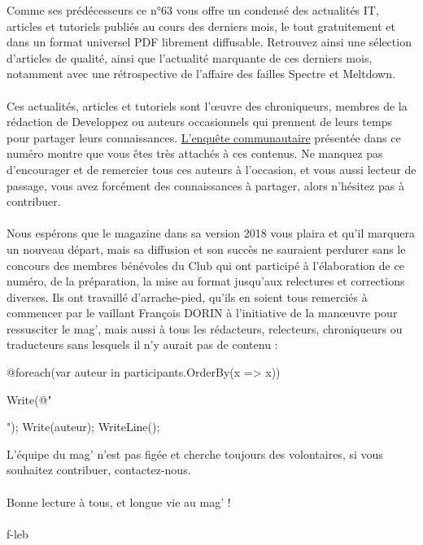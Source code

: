 Comme ses prédécesseurs ce n°63 vous offre un condensé des actualités IT, articles et tutoriels publiés au cours des derniers mois, le tout gratuitement et dans un format universel PDF librement diffusable. 
Retrouvez ainsi une sélection d'articles de qualité, ainsi que l'actualité marquante de ces derniers mois, notamment avec une rétrospective de l'affaire des failles Spectre et Meltdown.

\paragraph*{}

Ces actualités, articles et tutoriels sont l’œuvre des chroniqueurs, membres de la rédaction de Developpez ou auteurs occasionnels qui prennent de leurs temps pour partager leurs connaissances.
\hyperref[article-mag63-club-enquete-communautaire]{L'enquête communautaire} présentée dans ce numéro montre que vous êtes très attachés à ces contenus. Ne manquez pas d'encourager et de remercier 
tous ces auteurs à l'occasion, et vous aussi lecteur de passage, vous avez forcément des connaissances à partager, alors n'hésitez pas à contribuer.

\paragraph*{}

Nous espérons que le magazine dans sa version 2018 vous plaira et qu'il marquera un nouveau départ, mais sa diffusion et son succès ne sauraient perdurer sans le concours des membres bénévoles du Club qui ont participé à l'élaboration de ce numéro, de la préparation, la mise au format jusqu'aux relectures et corrections diverses. Ils ont travaillé d'arrache-pied, qu'ils en soient tous remerciés à commencer par le vaillant François DORIN à l'initiative de la manœuvre pour ressusciter le mag', mais aussi à tous les rédacteurs, relecteurs, chroniqueurs ou traducteurs sans lesquels il n'y aurait pas de contenu : 

\begin{itemize}
@foreach(var auteur in participants.OrderBy(x => x))
{
	Write(@"\item ");
	Write(auteur);
	WriteLine();
}
\end{itemize}

L'équipe du mag' n'est pas figée et cherche toujours des volontaires, si vous souhaitez contribuer, contactez-nous.

\paragraph*{}

Bonne lecture à tous, et longue vie au mag' !
\paragraph*{}

\begin{flushright}
f-leb
\end{flushright}
\clearpage